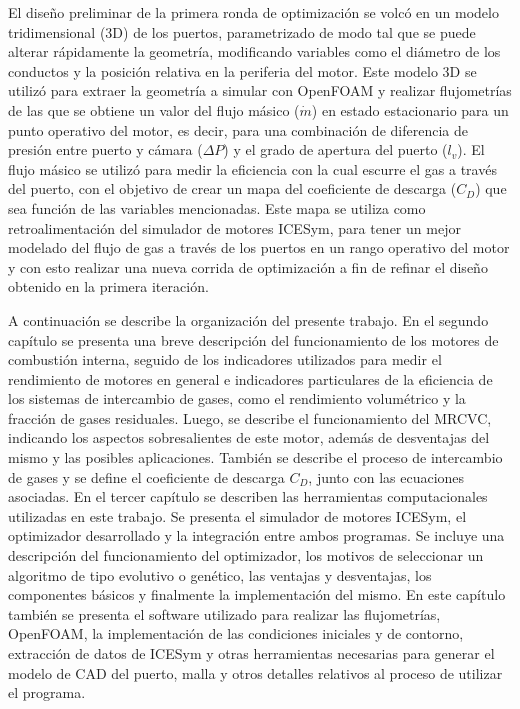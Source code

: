 El diseño preliminar de la primera ronda de optimización se volcó en un modelo
tridimensional (3D) de los puertos, parametrizado de modo tal que se puede
alterar rápidamente la geometría, modificando variables como el diámetro de los
conductos y la posición relativa en la periferia del motor.
%
Este modelo 3D se utilizó para extraer la geometría a simular con OpenFOAM y
realizar flujometrías de las que se obtiene un valor del flujo másico
($\dot{m}$) en estado estacionario para un punto operativo del motor, es decir,
para una combinación de diferencia de presión entre puerto y cámara
($\Delta P$) y el grado de apertura del puerto ($l_{v}$).
%
El flujo másico se utilizó para medir la eficiencia con la cual escurre el gas a
través del puerto, con el objetivo de crear un mapa del coeficiente de descarga
($C_{D}$) que sea función de las variables mencionadas.
%
Este mapa se utiliza como retroalimentación del simulador de motores ICESym,
para tener un mejor modelado del flujo de gas a través de los puertos en un
rango operativo del motor y con esto realizar una nueva corrida de optimización
a fin de refinar el diseño obtenido en la primera iteración.
%

%
A continuación se describe la organización del presente trabajo.
%
%
En el segundo capítulo se presenta una breve descripción del funcionamiento de
los motores de combustión interna, seguido de los indicadores utilizados para
medir el rendimiento de motores en general e indicadores particulares de la
eficiencia de los sistemas de intercambio de gases, como el rendimiento
volumétrico y la fracción de gases residuales.
%
Luego, se describe el funcionamiento del MRCVC, indicando los aspectos
sobresalientes de este motor, además de desventajas del mismo y las posibles
aplicaciones.
%
También se describe el proceso de intercambio de gases y se define el
coeficiente de descarga $C_{D}$, junto con las ecuaciones asociadas.
%
%
En el tercer capítulo se describen las herramientas computacionales utilizadas
en este trabajo.
%
Se presenta el simulador de motores ICESym, el optimizador desarrollado y
la integración entre ambos programas.
%
Se incluye una descripción del funcionamiento del optimizador, los motivos de
seleccionar un algoritmo de tipo evolutivo o genético, las ventajas y
desventajas, los componentes básicos y finalmente la implementación del mismo.
%
En este capítulo también se presenta el software utilizado para realizar las
flujometrías, OpenFOAM, la implementación de las condiciones iniciales y
de contorno, extracción de datos de ICESym y otras herramientas necesarias para
generar el modelo de CAD del puerto, malla y otros detalles relativos al proceso
de utilizar el programa.

